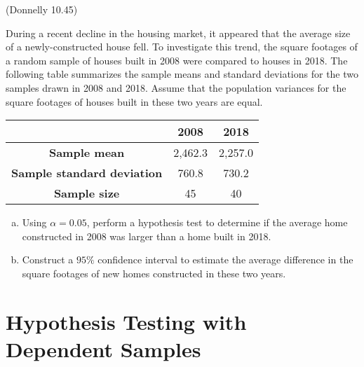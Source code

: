 \documentclass[12pt, letterpaper]{article}
\newcounter{exercise}
\theoremstyle{definition}
\begin{document}
\vfill

\newpage

\begin{exercise}  (Donnelly 10.45)

During a recent decline in the housing market, it appeared that the average size of a newly-constructed house fell.  To investigate this trend, the square footages of a random sample of houses built in 2008 were compared to houses in 2018.  The following table summarizes the sample means and standard deviations for the two samples drawn in 2008 and 2018.  Assume that the population variances for the square footages of houses built in these two years are equal.

\begin{center}
\begin{tabular}{c|c|c}

 & 2008 & 2018\\ \hline

\textbf{Sample mean} & 2,462.3 & 2,257.0\\ 

\textbf{Sample standard deviation} & 760.8 & 730.2\\

\textbf{Sample size} & 45 & 40

\end{tabular}
\end{center}


\end{exercise}

\vfill


\begin{enumerate}[(a)]

\item Using $\alpha = 0.05$, perform a hypothesis test to determine if the average home constructed in 2008 was larger than a home built in 2018.

\vfill
\vfill
\vfill

\item Construct a $95\%$ confidence interval to estimate the average difference in the square footages of new homes constructed in these two years.

\vfill
\vfill

\end{enumerate}


\newpage


\section*{Hypothesis Testing with Dependent Samples}
\end{document}
